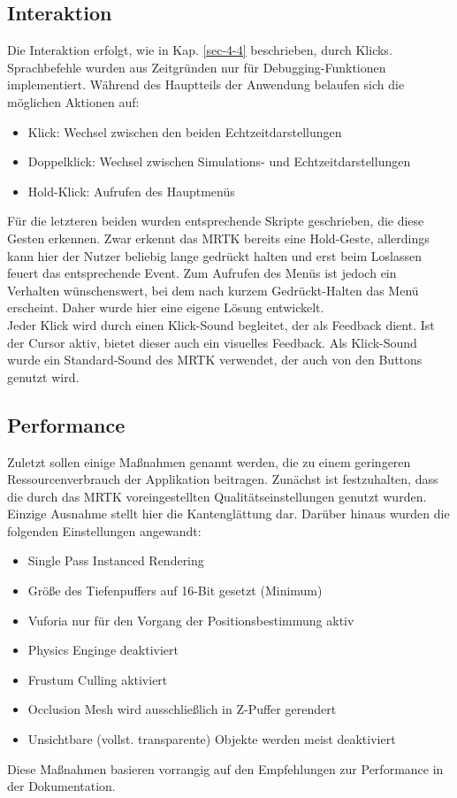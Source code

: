 \subsection{Interaktion}
Die Interaktion erfolgt, wie in Kap. \ref{sec-4-4} beschrieben, durch Klicks. Sprachbefehle wurden aus Zeitgründen nur für Debugging-Funktionen implementiert. 
Während des Hauptteils der Anwendung belaufen sich die möglichen Aktionen auf:

\begin{itemize}
	\setlength{\itemsep}{-1pt}
	\singlespacing
	\item Klick: Wechsel zwischen den beiden Echtzeitdarstellungen
	\item Doppelklick: Wechsel zwischen Simulations- und Echtzeitdarstellungen
	\item Hold-Klick: Aufrufen des Hauptmenüs
\end{itemize}

Für die letzteren beiden wurden entsprechende Skripte geschrieben, die diese Gesten erkennen. Zwar erkennt das MRTK bereits eine Hold-Geste, allerdings kann hier der Nutzer beliebig lange gedrückt halten und erst beim Loslassen feuert das entsprechende Event. Zum Aufrufen des Menüs ist jedoch ein Verhalten wünschenswert, bei dem nach kurzem Gedrückt-Halten das Menü erscheint. Daher wurde hier eine eigene Lösung entwickelt.\\

Jeder Klick wird durch einen Klick-Sound begleitet, der als Feedback dient. Ist der Cursor aktiv, bietet dieser auch ein visuelles Feedback. Als Klick-Sound wurde ein Standard-Sound des MRTK verwendet, der auch von den Buttons genutzt wird.

\subsection{Performance}
Zuletzt sollen einige Maßnahmen genannt werden, die zu einem geringeren Ressourcenverbrauch der Applikation beitragen. Zunächst ist festzuhalten, dass die durch das MRTK voreingestellten Qualitätseinstellungen genutzt wurden. Einzige Ausnahme stellt hier die Kantenglättung dar. Darüber hinaus wurden die folgenden Einstellungen angewandt:

\begin{itemize}
	\setlength{\itemsep}{-1pt}
	\singlespacing
	\item Single Pass Instanced Rendering
	\item Größe des Tiefenpuffers auf 16-Bit gesetzt (Minimum)
	\item Vuforia nur für den Vorgang der Positionsbestimmung aktiv
	\item Physics Enginge deaktiviert
	\item Frustum Culling aktiviert
	\item Occlusion Mesh wird ausschließlich in Z-Puffer gerendert
	\item Unsichtbare (vollst. transparente) Objekte werden meist deaktiviert
\end{itemize}

Diese Maßnahmen basieren vorrangig auf den Empfehlungen zur Performance in der Dokumentation.